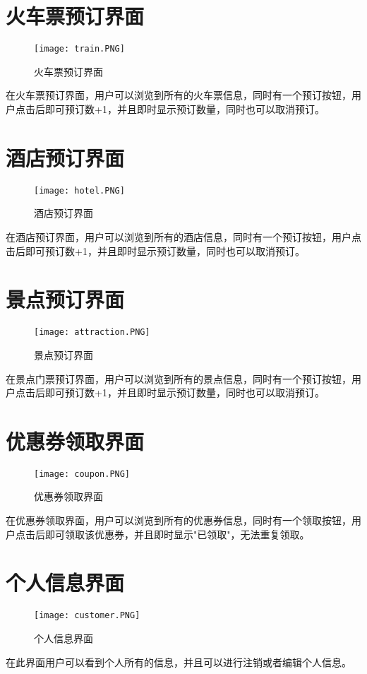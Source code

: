 \section{火车票预订界面}
\begin{figure}[H]
	\centering
	\texttt{[image: train.PNG]}
	\caption{火车票预订界面} 
	\label{fig:figure6}
\end{figure}
在火车票预订界面，用户可以浏览到所有的火车票信息，同时有一个预订按钮，用户点击后即可预订数+1，并且即时显示预订数量，同时也可以取消预订。


\section{酒店预订界面}
\begin{figure}[H]
	\centering
	\texttt{[image: hotel.PNG]}
	\caption{酒店预订界面} 
	\label{fig:figure7}
\end{figure}
在酒店预订界面，用户可以浏览到所有的酒店信息，同时有一个预订按钮，用户点击后即可预订数+1，并且即时显示预订数量，同时也可以取消预订。


\section{景点预订界面}
\begin{figure}[H]
	\centering
	\texttt{[image: attraction.PNG]}
	\caption{景点预订界面} 
	\label{fig:figure8}
\end{figure}
在景点门票预订界面，用户可以浏览到所有的景点信息，同时有一个预订按钮，用户点击后即可预订数+1，并且即时显示预订数量，同时也可以取消预订。



\section{优惠券领取界面}
\begin{figure}[H]
	\centering
	\texttt{[image: coupon.PNG]}
	\caption{优惠券领取界面} 
	\label{fig:figure9}
\end{figure}
在优惠券领取界面，用户可以浏览到所有的优惠券信息，同时有一个领取按钮，用户点击后即可领取该优惠券，并且即时显示"已领取"，无法重复领取。



\section{个人信息界面}
\begin{figure}[H]
	\centering
	\texttt{[image: customer.PNG]}
	\caption{个人信息界面} 
	\label{fig:figure10}
\end{figure}
在此界面用户可以看到个人所有的信息，并且可以进行注销或者编辑个人信息。


